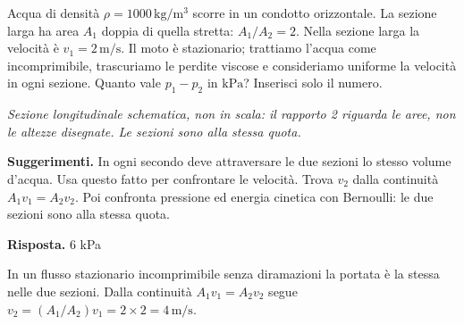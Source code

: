 \documentclass[11pt,a4paper]{article}
\begin{document}
\begin{samepage}
\par\smallskip
Acqua di densità \(\rho=1000\,\mathrm{kg/m^3}\) scorre in un condotto orizzontale. La sezione larga ha area \(A_1\) doppia di quella stretta: \(A_1/A_2=2\). Nella sezione larga la velocità è \(v_1=2\,\mathrm{m/s}\). Il moto è stazionario; trattiamo l’acqua come incomprimibile, trascuriamo le perdite viscose e consideriamo uniforme la velocità in ogni sezione. Quanto vale \(p_1-p_2\) in \(\mathrm{kPa}\)? Inserisci solo il numero.\par

\begin{center}
\par
\small\itshape Sezione longitudinale schematica, non in scala: il rapporto 2 riguarda le aree, non le altezze disegnate. Le sezioni sono alla stessa quota.
\end{center}

{\small\textbf{Suggerimenti.} In ogni secondo deve attraversare le due sezioni lo stesso volume d’acqua. Usa questo fatto per confrontare le velocità. Trova \(v_2\) dalla continuità \(A_1v_1=A_2v_2\). Poi confronta pressione ed energia cinetica con Bernoulli: le due sezioni sono alla stessa quota.\par}
\medskip\noindent\textbf{Risposta.} 6 kPa\par


In un flusso stazionario incomprimibile senza diramazioni la portata è la stessa nelle due sezioni. Dalla continuità \(A_1v_1=A_2v_2\) segue \(v_2=(A_1/A_2)v_1=2\times2=4\,\mathrm{m/s}\).\par


\end{samepage}
\end{document}
